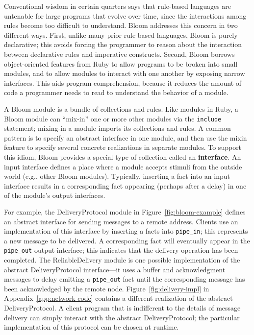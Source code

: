 \begin{comment}
Conventional wisdom in certain quarters says that rule-based languages are
untenable for large programs that evolve over time, since the interactions among
rules become too difficult to understand.  We believe this concern is an
artifact of early rule languages that mixed apparently declarative syntax with
imperative constructs and assumptions, and which had little support for
modularity and reuse of code.
\end{comment}

Conventional wisdom in certain quarters says that rule-based languages are
untenable for large programs that evolve over time, since the interactions among
rules become too difficult to understand.  Bloom addresses this concern in two
different ways. First, unlike many prior rule-based languages, Bloom is purely
declarative; this avoids forcing the programmer to reason about the interaction
between declarative rules and imperative constructs. Second, Bloom borrows
object-oriented features from Ruby to allow programs to be broken into small
modules, and to allow modules to interact with one another by exposing narrow
interfaces. This aids program comprehension, because it reduces the amount of
code a programmer needs to read to understand the behavior of a module.

A Bloom module is a bundle of collections and rules. Like modules in Ruby, a
Bloom module can ``mix-in'' one or more other modules via the \texttt{include}
statement; mixing-in a module imports its collections and rules. A common
pattern is to specify an abstract interface in one module, and then use the
mixin feature to specify several concrete realizations in separate modules. To
support this idiom, Bloom provides a special type of collection called an
\textbf{interface}. An input interface defines a place where a module accepts
stimuli from the outside world (e.g., other Bloom modules). Typically, inserting
a fact into an input interface results in a corresponding fact appearing
(perhaps after a delay) in one of the module's output interfaces.

For example, the DeliveryProtocol module in Figure~\ref{fig:bloom-example}
defines an abstract interface for sending messages to a remote address. Clients
use an implementation of this interface by inserting a facts into
\texttt{pipe\_in}; this represents a new message to be delivered. A
corresponding fact will eventually appear in the \texttt{pipe\_out} output
interface; this indicates that the delivery operation has been completed. The
ReliableDelivery module is one possible implementation of the abstract
DeliveryProtocol interface---it uses a buffer and acknowledgment messages to
delay emitting a \texttt{pipe\_out} fact until the corresponding message has
been acknowledged by the remote node. Figure~\ref{fig:delivery-impl} in
Appendix~\ref{app:network-code} contains a different realization of the abstract
DeliveryProtocol. A client program that is indifferent to the details of message
delivery can simply interact with the abstract DeliveryProtocol; the particular
implementation of this protocol can be chosen at runtime.

